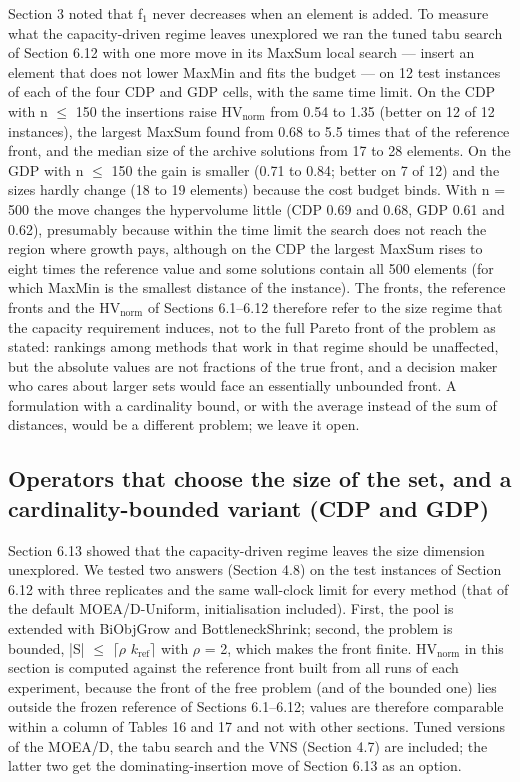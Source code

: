 Section 3 noted that f$_{1}$ never decreases when an element is added. To measure what the capacity-driven regime leaves unexplored we ran the tuned tabu search of Section 6.12 with one more move in its MaxSum local search --- insert an element that does not lower MaxMin and fits the budget --- on 12 test instances of each of the four CDP and GDP cells, with the same time limit. On the CDP with n $\leq$ 150 the insertions raise $\mathrm{HV}_{\mathrm{norm}}$ from 0.54 to 1.35 (better on 12 of 12 instances), the largest MaxSum found from 0.68 to 5.5 times that of the reference front, and the median size of the archive solutions from 17 to 28 elements. On the GDP with n $\leq$ 150 the gain is smaller (0.71 to 0.84; better on 7 of 12) and the sizes hardly change (18 to 19 elements) because the cost budget binds. With n = 500 the move changes the hypervolume little (CDP 0.69 and 0.68, GDP 0.61 and 0.62), presumably because within the time limit the search does not reach the region where growth pays, although on the CDP the largest MaxSum rises to eight times the reference value and some solutions contain all 500 elements (for which MaxMin is the smallest distance of the instance). The fronts, the reference fronts and the $\mathrm{HV}_{\mathrm{norm}}$ of Sections 6.1--6.12 therefore refer to the size regime that the capacity requirement induces, not to the full Pareto front of the problem as stated: rankings among methods that work in that regime should be unaffected, but the absolute values are not fractions of the true front, and a decision maker who cares about larger sets would face an essentially unbounded front. A formulation with a cardinality bound, or with the average instead of the sum of distances, would be a different problem; we leave it open.

\subsection{Operators that choose the size of the set, and a cardinality-bounded variant (CDP and GDP)}\label{sec:operators_that_choose_the_si}

Section 6.13 showed that the capacity-driven regime leaves the size dimension unexplored. We tested two answers (Section 4.8) on the test instances of Section 6.12 with three replicates and the same wall-clock limit for every method (that of the default MOEA/D-Uniform, initialisation included). First, the pool is extended with BiObjGrow and BottleneckShrink; second, the problem is bounded, |S| $\leq$ $\lceil$$\rho$ $k_{\mathrm{ref}}$$\rceil$ with $\rho$ = 2, which makes the front finite. $\mathrm{HV}_{\mathrm{norm}}$ in this section is computed against the reference front built from all runs of each experiment, because the front of the free problem (and of the bounded one) lies outside the frozen reference of Sections 6.1--6.12; values are therefore comparable within a column of Tables 16 and 17 and not with other sections. Tuned versions of the MOEA/D, the tabu search and the VNS (Section 4.7) are included; the latter two get the dominating-insertion move of Section 6.13 as an option.

